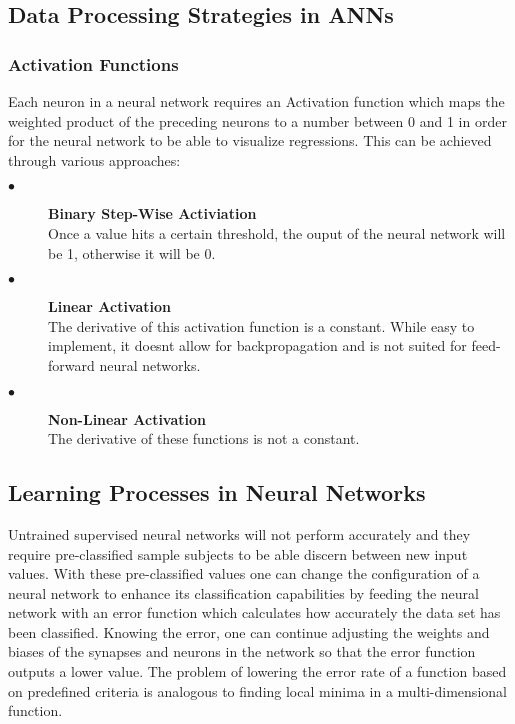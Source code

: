 \subsection{Data Processing Strategies in ANNs}
\subsubsection{Activation Functions}
Each neuron in a neural network requires an Activation function which maps the weighted product of the preceding neurons to a number between 0 and 1 in order for the neural network to be able to visualize regressions. This can be achieved through various approaches:
\begin{description}
\item[$\bullet$] \textbf{Binary Step-Wise Activiation}\\
Once a value hits a certain threshold, the ouput of the neural network will be 1, otherwise it will be 0.
\item[$\bullet$] \textbf{Linear Activation}\\
The derivative of this activation function is a constant. While easy to implement, it doesnt allow for backpropagation and is not suited for feed-forward neural networks.
\item[$\bullet$] \textbf{Non-Linear Activation}\\
The derivative of these functions is not a constant.
\end{description}
\subsection{Learning Processes in Neural Networks}
Untrained supervised neural networks will not perform accurately and they require pre-classified sample subjects to be able discern between new input values. With these pre-classified values one can change the configuration of a neural network to enhance its classification capabilities by feeding the neural network with an error function which calculates how accurately the data set has been classified. Knowing the error, one can continue adjusting the weights and biases of the synapses and neurons in the network so that the error function outputs a lower value.
The problem of lowering the error rate of a function based on predefined criteria is analogous to finding local minima in a multi-dimensional function.
